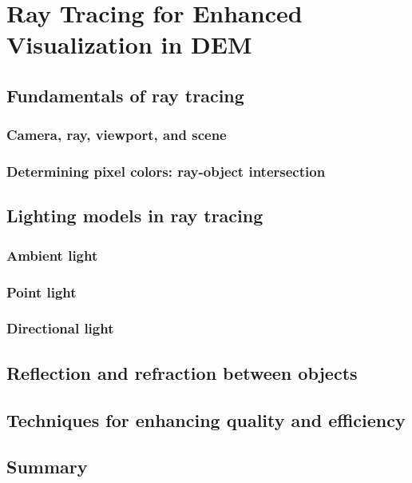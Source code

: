 \documentclass[../main]{subfiles}
\begin{document}
\chapter{Ray Tracing for Enhanced Visualization in DEM}
\label{ch:appendix_raytracing}

\section{Fundamentals of ray tracing}
\label{sec:rt_fundamentals}

\subsection{Camera, ray, viewport, and scene}
\label{subsec:rt_camera}

\subsection{Determining pixel colors: ray-object intersection}
\label{subsec:rt_intersection}

\section{Lighting models in ray tracing}
\label{sec:rt_lighting}

\subsection{Ambient light}
\subsection{Point light}
\subsection{Directional light}

\section{Reflection and refraction between objects}
\label{sec:rt_reflection}

\section{Techniques for enhancing quality and efficiency}
\label{sec:rt_techniques}

\section{Summary}
\label{sec:rt_summary}
\end{document}
